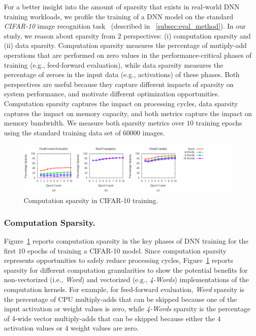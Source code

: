 For a better insight into the amount of sparsity that exists in real-world DNN training workloads, we profile the training of a DNN model on the standard {\it CIFAR-10} image recognition task~\cite{KrizhevskyThesis} (described in ~\ref{subsec:eval_method}).  In our study, we reason about sparsity from $2$ perspectives: (i) computation sparsity and (ii)  data sparsity.  Computation sparsity measures the percentage of mutiply-add operations that are performed on zero values in the performance-critical phases of training (e.g., feed-forward evaluation), while data sparsity measures the percentage of zeroes in the input data (e.g., activations) of these phases.  Both perspectives are useful because they capture different impacts of sparsity on system performance, and motivate different optimization opportunities.  Computation sparsity captures the impact on processing cycles, data sparsity captures the impact on memory capacity, and both metrics capture the impact on memory bandwidth.  We measure both sparsity metrics over $10$ training epochs using the standard training data set of $60000$ images. 

\begin{figure}
 \centering
 \includegraphics[width=1.9\columnwidth]{Figures/multi_computesparsity.png}
\caption{Computation sparsity in CIFAR-10 training.}
 \label{fig:cifar-10_compute_sparsity}
 \end{figure}
 
\subsubsection{Computation Sparsity.}
 Figure~\ref{fig:cifar-10_compute_sparsity} reports computation sparsity in the key phases of DNN training for the first $10$ epochs of training a CIFAR-10 model.  Since computation sparsity represents opportunities to safely reduce processing cycles, Figure~\ref{fig:cifar-10_compute_sparsity} reports sparsity for different computation granularities to show the potential benefits for non-vectorized (i.e., {\it Word}) and vectorized (e.g., {\it 4-Words}) implementations of the computation kernels.  For example, for feed-forward evaluation, {\it Word} sparsity is the percentage of CPU multiply-adds that can be skipped because one of the input activation or weight values is zero, while {\it 4-Words} sparsity is the percentage of 4-wide vector multiply-adds that can be skipped because either the $4$ activation values or $4$ weight values are zero. 
 
